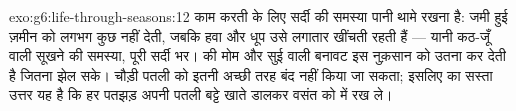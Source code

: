 \begin{solution}{exo:g6:life-through-seasons:12}
काम करती  के लिए सर्दी की समस्या पानी थामे रखना है: जमी हुई ज़मीन
 को लगभग कुछ नहीं देती, जबकि हवा और धूप उसे लगातार खींचती रहती हैं
--- यानी कठ-जूँ वाली सूखने की समस्या, पूरी सर्दी भर।   की
मोम और सुई वाली बनावट इस नुक़सान को उतना कर देती है जितना  झेल सके।
चौड़ी पतली  को इतनी अच्छी तरह बंद नहीं किया जा सकता; इसलिए 
 का सस्ता उत्तर यह है कि हर पतझड़ अपनी पतली  बट्टे खाते
डालकर वसंत को  में रख ले।
\end{solution}

